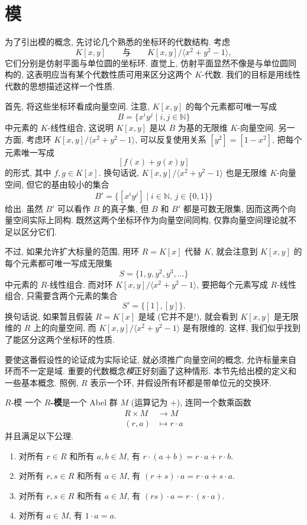 \section{模}\label{sec:r-modules}

为了引出模的概念, 先讨论几个熟悉的坐标环的代数结构. 考虑
\[
  K[x,y]\qquad\text{与}\qquad K[x,y]/\langle x^{2}+y^{2}-1\rangle,
\]
它们分别是仿射平面与单位圆的坐标环. 直觉上, 仿射平面显然不像是与单位圆同构的, 这表明应当有某个代数性质可用来区分这两个 $K$-代数. 我们的目标是用线性代数的思想描述这样一个性质.

首先, 将这些坐标环看成向量空间. 注意, $K[x,y]$ 的每个元素都可唯一写成
\[
  B=\{x^{i}y^{j}\mid i,j\in\mathbb{N}\}
\]
中元素的 $K$-线性组合, 这说明 $K[x,y]$ 是以 $B$ 为基的无限维 $K$-向量空间. 另一方面, 考虑环 $K[x,y]/\langle x^{2}+y^{2}-1\rangle$, 可以反复使用关系 $[y^{2}]=[1-x^{2}]$, 把每个元素唯一写成
\[
  [f(x)+g(x)y]
\]
的形式, 其中 $f,g\in K[x]$. 换句话说, $K[x,y]/\langle x^{2}+y^{2}-1\rangle$ 也是无限维 $K$-向量空间, 但它的基由较小的集合
\[
  B'=\{[x^{i}y^{j}]\mid i\in\mathbb{N},\, j\in\{0,1\}\}
\]
给出. 虽然 $B'$ 可以看作 $B$ 的真子集, 但 $B$ 和 $B'$ 都是可数无限集, 因而这两个向量空间实际上同构. 既然这两个坐标环作为向量空间同构, 仅靠向量空间理论就不足以区分它们.

不过, 如果允许扩大\textquotedbl{}标量\textquotedbl{}的范围, 用环 $R=K[x]$ 代替 $K$, 就会注意到 $K[x,y]$ 的每个元素都可唯一写成无限集
\[
  S=\{1,y,y^{2},y^{3},\ldots\}
\]
中元素的 $R$-线性组合. 而对环 $K[x,y]/\langle x^{2}+y^{2}-1\rangle$, 要把每个元素写成 $R$-线性组合, 只需要含两个元素的集合
\[
  S'=\{[1],[y]\}.
\]
换句话说, 如果暂且假装 $R=K[x]$ 是域 (它并不是!), 就会看到 $K[x,y]$ 是无限维的 $R$ 上的\textquotedbl{}向量空间\textquotedbl{}, 而 $K[x,y]/\langle x^{2}+y^{2}-1\rangle$ 是有限维的. 这样, 我们似乎找到了能区分这两个坐标环的性质.

要使这番假设性的论证成为实际论证, 就必须推广向量空间的概念, 允许标量来自环而不一定是域. 重要的代数概念\emph{模}正好刻画了这种情形. 本节先给出模的定义和一些基本概念. 照例, $R$ 表示一个环, 并假设所有环都是带单位元的交换环.

\begin{Definition}{$R$-模}\leavevmode\label{def:r-module}
  一个 \textbf{$R$-模}是一个 Abel 群 $M$ (运算记为 $+$), 连同一个数乘函数
  \[
    \begin{aligned}
      R\times M&\to M\\
      (r,a)&\mapsto r\cdot a
    \end{aligned}
  \]
  并且满足以下公理.
  \begin{enumerate}
    \item 对所有 $r\in R$ 和所有 $a,b\in M$, 有 $r\cdot(a+b)=r\cdot a+r\cdot b$.
    \item 对所有 $r,s\in R$ 和所有 $a\in M$, 有 $(r+s)\cdot a=r\cdot a+s\cdot a$.
    \item 对所有 $r,s\in R$ 和所有 $a\in M$, 有 $(rs)\cdot a=r\cdot(s\cdot a)$.
    \item 对所有 $a\in M$, 有 $1\cdot a=a$.
  \end{enumerate}
\end{Definition}

